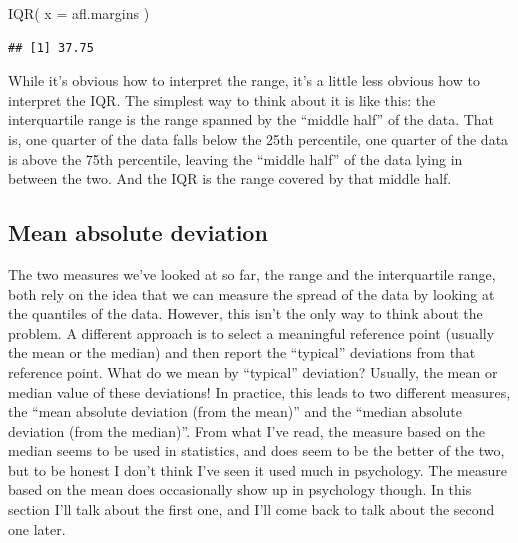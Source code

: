 \documentclass[
]{book}
\newenvironment{Shaded}{\begin{snugshade}}{\end{snugshade}}
\newcommand{\AttributeTok}[1]{\textcolor[rgb]{0.77,0.63,0.00}{#1}}
\newcommand{\FunctionTok}[1]{\textcolor[rgb]{0.00,0.00,0.00}{#1}}
\newcommand{\NormalTok}[1]{#1}
\begin{document}
\begin{Shaded}
\begin{Highlighting}[]
\FunctionTok{IQR}\NormalTok{( }\AttributeTok{x =}\NormalTok{ afl.margins )}
\end{Highlighting}
\end{Shaded}

\begin{verbatim}
## [1] 37.75
\end{verbatim}

While it's obvious how to interpret the range, it's a little less obvious how to interpret the IQR. The simplest way to think about it is like this: the interquartile range is the range spanned by the ``middle half'' of the data. That is, one quarter of the data falls below the 25th percentile, one quarter of the data is above the 75th percentile, leaving the ``middle half'' of the data lying in between the two. And the IQR is the range covered by that middle half.

\hypertarget{aad}{%
\subsection{Mean absolute deviation}\label{aad}}

The two measures we've looked at so far, the range and the interquartile range, both rely on the idea that we can measure the spread of the data by looking at the quantiles of the data. However, this isn't the only way to think about the problem. A different approach is to select a meaningful reference point (usually the mean or the median) and then report the ``typical'' deviations from that reference point. What do we mean by ``typical'' deviation? Usually, the mean or median value of these deviations! In practice, this leads to two different measures, the ``mean absolute deviation (from the mean)'' and the ``median absolute deviation (from the median)''. From what I've read, the measure based on the median seems to be used in statistics, and does seem to be the better of the two, but to be honest I don't think I've seen it used much in psychology. The measure based on the mean does occasionally show up in psychology though. In this section I'll talk about the first one, and I'll come back to talk about the second one later.
\end{document}
